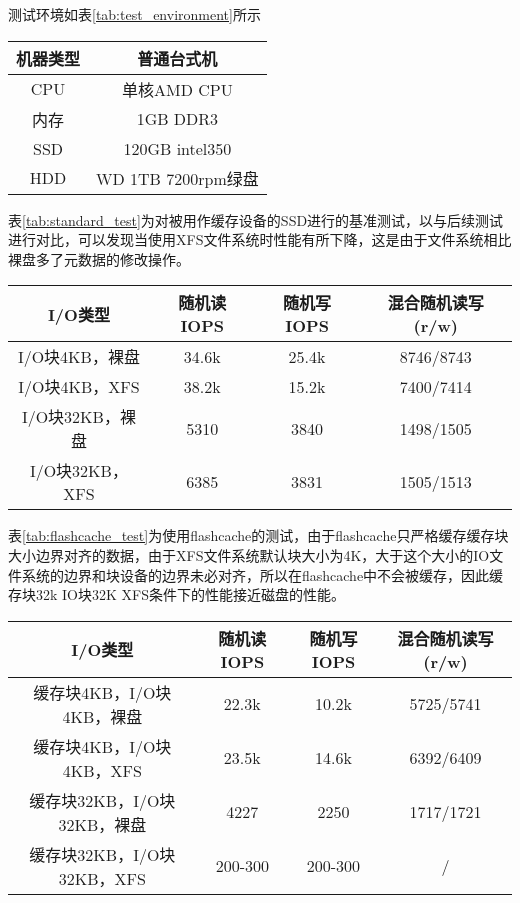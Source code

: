 测试环境如表\ref{tab:test_environment}所示

\begin{table}[!hpb]
    \centering
    \begin{tabular}{cc} \toprule
      机器类型 & 普通台式机 \\ \midrule
      CPU & 单核AMD CPU\\
      内存 & 1GB DDR3\\
      SSD & 120GB intel350 \\
      HDD & WD 1TB 7200rpm绿盘\\
      \bottomrule
    \end{tabular}
\end{table}

表\ref{tab:standard_test}为对被用作缓存设备的SSD进行的基准测试，以与后续测试进行对比，可以发现当使用XFS文件系统时性能有所下降，这是由于文件系统相比裸盘多了元数据的修改操作。

\begin{table}[!hpb]
    \centering
    \begin{tabular}{cccc} 
      \toprule
      I/O类型 & 随机读IOPS & 随机写IOPS & 混合随机读写(r/w) \\ 
      \midrule
      I/O块4KB，裸盘 & 34.6k & 25.4k & 8746/8743 \\
      I/O块4KB，XFS & 38.2k & 15.2k & 7400/7414 \\
      I/O块32KB，裸盘 & 5310 & 3840 & 1498/1505 \\
      I/O块32KB，XFS & 6385 & 3831 & 1505/1513 \\
      \bottomrule
    \end{tabular}
\end{table}

表\ref{tab:flashcache_test}为使用flashcache的测试，由于flashcache只严格缓存缓存块大小边界对齐的数据，由于XFS文件系统默认块大小为4K，大于这个大小的IO文件系统的边界和块设备的边界未必对齐，所以在flashcache中不会被缓存，因此缓存块32k IO块32K XFS条件下的性能接近磁盘的性能。 

\begin{table}[!hpb]
    \centering
    \begin{tabular}{cccc} 
      \toprule
      I/O类型 & 随机读IOPS & 随机写IOPS & 混合随机读写(r/w) \\ 
      \midrule
      缓存块4KB，I/O块4KB，裸盘 & 22.3k & 10.2k & 5725/5741 \\
      缓存块4KB，I/O块4KB，XFS & 23.5k & 14.6k & 6392/6409 \\
      缓存块32KB，I/O块32KB，裸盘 & 4227 & 2250 & 1717/1721 \\
      缓存块32KB，I/O块32KB，XFS & 200-300 & 200-300 & / \\
      \bottomrule
    \end{tabular}
\end{table}

